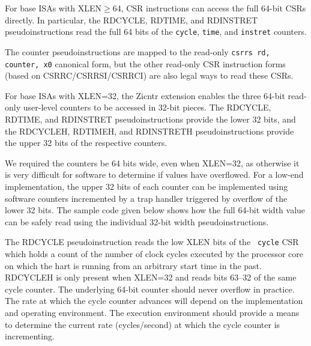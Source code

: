For base ISAs with XLEN$\geq$64, CSR instructions can access the full
64-bit CSRs directly.  In particular, the RDCYCLE, RDTIME, and
RDINSTRET pseudoinstructions read the full 64 bits of the {\tt cycle},
{\tt time}, and {\tt instret} counters.

\begin{commentary}
The counter pseudoinstructions are mapped to the read-only {\tt csrrs
  rd, counter, x0} canonical form, but the other read-only CSR
instruction forms (based on CSRRC/CSRRSI/CSRRCI) are also legal ways
to read these CSRs.
\end{commentary}

For base ISAs with XLEN=32, the Zicntr extension enables the three
64-bit read-only user-level counters to be accessed in 32-bit pieces.
The RDCYCLE, RDTIME, and RDINSTRET pseudoinstructions provide the lower 32
bits, and the RDCYCLEH, RDTIMEH, and RDINSTRETH pseudoinstructions provide
the upper 32 bits of the respective counters.

\begin{commentary}
We required the counters be 64 bits wide, even when XLEN=32, as otherwise
it is very difficult for software to determine if values have
overflowed.  For a low-end implementation, the upper 32 bits of each
counter can be implemented using software counters incremented by a
trap handler triggered by overflow of the lower 32 bits.  The sample
code given below shows how the full 64-bit width value can be
safely read using the individual 32-bit width pseudoinstructions.
\end{commentary}

The RDCYCLE pseudoinstruction reads the low XLEN bits of the {\tt
  cycle} CSR which holds a count of the number of clock cycles
executed by the processor core on which the hart is running from an
arbitrary start time in the past.  RDCYCLEH is only present when
XLEN=32 and reads bits 63--32 of the same cycle
counter.  The underlying 64-bit counter should never overflow in
practice.  The rate at which the cycle counter advances will depend on
the implementation and operating environment.  The execution
environment should provide a means to determine the current rate
(cycles/second) at which the cycle counter is incrementing.

